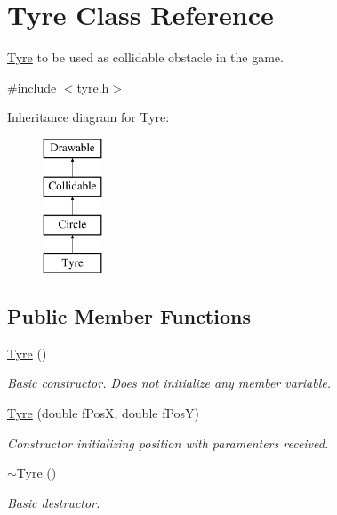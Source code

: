 \hypertarget{class_tyre}{}\section{Tyre Class Reference}
\label{class_tyre}


\hyperlink{class_tyre}{Tyre} to be used as collidable obstacle in the game.  




{\ttfamily \#include $<$tyre.\+h$>$}

Inheritance diagram for Tyre\+:\begin{figure}[H]
\begin{center}
\leavevmode
\includegraphics[height=4.000000cm]{class_tyre}
\end{center}
\end{figure}
\subsection*{Public Member Functions}
\begin{DoxyCompactItemize}
\item 
\hypertarget{class_tyre_a162dbaad7ae74443df530dfb147fb694}{}\hyperlink{class_tyre_a162dbaad7ae74443df530dfb147fb694}{Tyre} ()\label{class_tyre_a162dbaad7ae74443df530dfb147fb694}

\begin{DoxyCompactList}\small\item\em Basic constructor. Does not initialize any member variable. \end{DoxyCompactList}\item 
\hyperlink{class_tyre_aa8316602e846dd79412579a2c3ad92c7}{Tyre} (double f\+Pos\+X, double f\+Pos\+Y)
\begin{DoxyCompactList}\small\item\em Constructor initializing position with paramenters received. \end{DoxyCompactList}\item 
\hypertarget{class_tyre_a3ace196877f68acd82b89e8cd33825ec}{}\hyperlink{class_tyre_a3ace196877f68acd82b89e8cd33825ec}{$\sim$\+Tyre} ()\label{class_tyre_a3ace196877f68acd82b89e8cd33825ec}

\begin{DoxyCompactList}\small\item\em Basic destructor. \end{DoxyCompactList}\end{DoxyCompactItemize}

